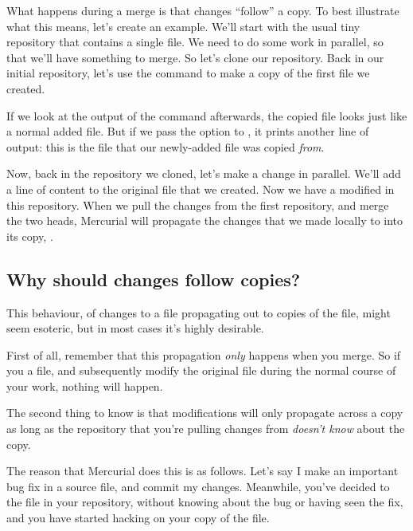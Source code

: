 What happens during a merge is that changes ``follow'' a copy.  To
best illustrate what this means, let's create an example.  We'll start
with the usual tiny repository that contains a single file.
We need to do some work in parallel, so that we'll have something to
merge.  So let's clone our repository.
Back in our initial repository, let's use the  command to
make a copy of the first file we created.

If we look at the output of the  command afterwards, the
copied file looks just like a normal added file.
But if we pass the  option to , it
prints another line of output: this is the file that our newly-added
file was copied \emph{from}.

Now, back in the repository we cloned, let's make a change in
parallel.  We'll add a line of content to the original file that we
created.
Now we have a modified  in this repository.  When we
pull the changes from the first repository, and merge the two heads,
Mercurial will propagate the changes that we made locally to
 into its copy, .

\subsection{Why should changes follow copies?}
\label{sec:daily:why-copy}

This behaviour, of changes to a file propagating out to copies of the
file, might seem esoteric, but in most cases it's highly desirable.

First of all, remember that this propagation \emph{only} happens when
you merge.  So if you  a file, and subsequently modify the
original file during the normal course of your work, nothing will
happen.

The second thing to know is that modifications will only propagate
across a copy as long as the repository that you're pulling changes
from \emph{doesn't know} about the copy.

The reason that Mercurial does this is as follows.  Let's say I make
an important bug fix in a source file, and commit my changes.
Meanwhile, you've decided to  the file in your repository,
without knowing about the bug or having seen the fix, and you have
started hacking on your copy of the file.


